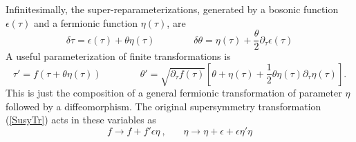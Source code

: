 \documentclass[aps,pre,preprint,onecolumn,citeautoscript,superscriptaddress,nofootinbib,eqsecnum]{revtex4-1}
\def\nref#1{(\ref{#1})}
\def\be{\begin{equation}}
\def\ee{\end{equation}}
\def\la{\label}
\begin{document}
Infinitesimally, the  super-reparameterizations, generated by a bosonic function $\epsilon(\tau)$ and a fermionic function $\eta(\tau)$, are 
\begin{equation}
\delta \tau = \epsilon(\tau) + \theta \eta(\tau) \qquad \qquad \delta \theta = \eta(\tau) + \frac{\theta}{2} \partial_\tau \epsilon(\tau) 
\end{equation}
A useful parameterization of finite transformations is
\begin{equation} \la{susyvar}
\tau' = f(\tau + \theta \eta(\tau) ) \qquad \qquad \theta' = \sqrt{\partial_\tau f(\tau)}\left[ \theta  + \eta(\tau) + \frac12 \theta \eta(\tau)\partial_\tau \eta(\tau)\right].
\end{equation}
This is just the composition of a general fermionic transformation of parameter $\eta$ followed by a diffeomorphism.  The original supersymmetry transformation 
\nref{SusyTr} acts in these variables as 
\be \la{SusyComp} 
f \to f + f' \epsilon \eta ~,~~~~~~~~ \eta \to \eta + \epsilon + \epsilon \eta' \eta 
\ee
\end{document}
